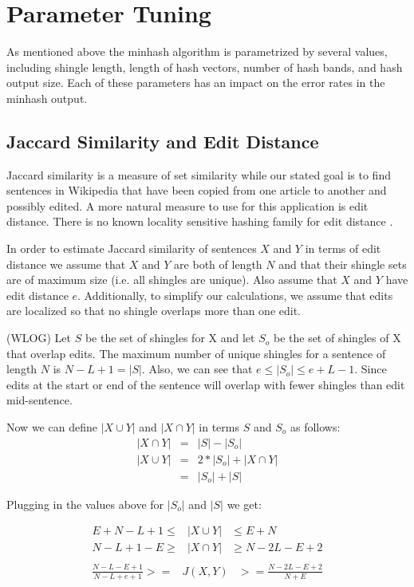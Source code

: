 \documentclass{acm_proc_article-sp}
\begin{document}
\section{Parameter Tuning}

As mentioned above the minhash algorithm is parametrized by several values, including shingle length, length of hash vectors, number of hash bands, and hash output size. Each of these parameters has an impact on the error rates in the minhash output. 

\subsection{Jaccard Similarity and Edit Distance}

Jaccard similarity is a measure of set similarity while our stated goal is to find sentences in Wikipedia that have been copied from one article to another and possibly edited. A more natural measure to use for this application is edit distance. There is no known locality sensitive hashing family for edit distance \citation{}.

In order to estimate Jaccard similarity of sentences $X$ and $Y$ in terms of edit distance we assume that $X$ and $Y$ are both of length $N$ and that their shingle sets are of maximum size (i.e. all shingles are unique). Also assume that $X$ and $Y$ have edit distance $e$.  Additionally, to simplify our calculations, we assume that edits are localized so that no shingle overlaps more than one edit.

(WLOG) Let $S$ be the set of shingles for X and let $S_o$ be the set of shingles of X that overlap edits. The maximum number of unique shingles for a sentence of length $N$ is $N - L + 1 = |S|$. Also, we can see that $e \le |S_o| \le e + L - 1$. Since edits at the start or end of the sentence will overlap with fewer shingles than edit mid-sentence.

Now we can define $|X \cup Y|$ and $|X \cap Y|$ in terms $S$ and $S_o$ as follows:
\begin{eqnarray*}
|X \cap Y| & = & |S| - |S_o| \\
|X \cup Y| & = & 2*|S_o| + |X \cap Y| \\
           & = & |S_o| + |S|
\end{eqnarray*}

Plugging in the values above for $|S_o|$ and $|S|$ we get:

\begin{eqnarray*}
E + N - L + 1  \le & |X \cup Y| & \le E + N \\
N - L + 1 - E  \ge & |X \cap Y| & \ge N - 2L - E + 2 \\
\end{eqnarray*}
\begin{eqnarray*}
\frac{N - L - E + 1 }{N - L + e + 1} >= & J(X,Y) & >= \frac{N - 2L - E + 2}{N + E}
\end{eqnarray*}
\end{document}
